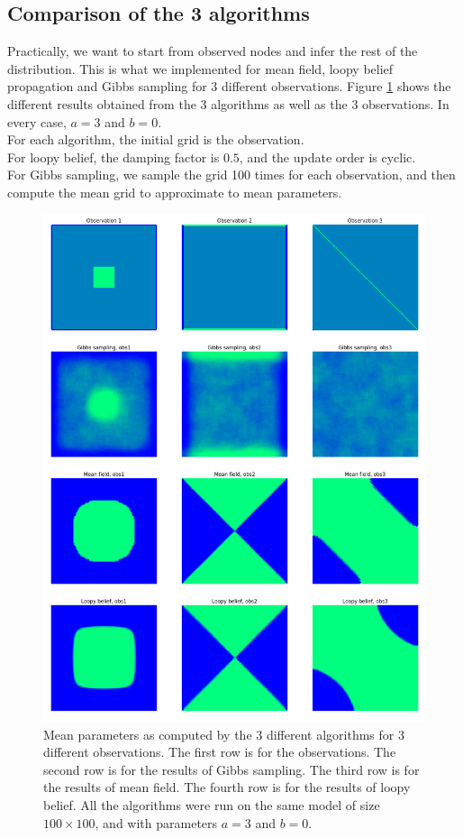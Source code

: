 \documentclass[a4paper]{article}
\begin{document}
    
    
    \subsection{Comparison of the 3 algorithms}
    Practically, we want to start from observed nodes and infer the rest of the distribution. This is what we implemented for mean field, loopy belief propagation and Gibbs sampling for 3 different observations. Figure \ref{figure:compare1} shows the different results obtained from the 3 algorithms as well as the 3 observations. In every case, $a=3$ and $b=0$.
    \\
    For each algorithm, the initial grid is the observation. 
    \\
    For loopy belief, the damping factor is $0.5$, and the update order is cyclic.
    \\
    For Gibbs sampling, we sample the grid 100 times for each observation, and then compute the mean grid to approximate to mean parameters.
    \begin{figure}[ht]
        \centering
    	\includegraphics[scale=0.4]{compare_mf_lb_gibbs_3_3}
    	\caption{Mean parameters as computed by the 3 different algorithms for 3 different observations. The first row is for the observations. The second row is for the results of Gibbs sampling. The third row is for the results of mean field. The fourth row is for the results of loopy belief. All the algorithms were run on the same model of size $100 \times 100$, and with parameters $a=3$ and $b=0$.}
    	\label{figure:compare1}
    \end{figure}
    
\end{document}
